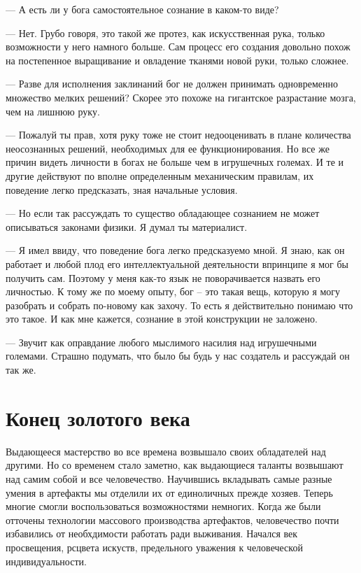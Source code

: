 \documentclass[12pt,a4paper]{article}
\newcommand{\tr}[1]{\textcolor{red}{#1}}
\newcommand{\todo}[1]{\marginpar{\scriptsize \tr{#1}}}
\begin{document}
--- А есть ли у бога самостоятельное сознание в каком-то виде?

--- Нет. Грубо говоря, это такой же протез, как искусственная рука, только возможности у него намного больше. Сам процесс его создания довольно похож на постепенное выращивание и овладение тканями новой руки, только сложнее.

--- Разве для исполнения заклинаний бог не должен принимать одновременно множество мелких решений? Скорее это похоже на гигантское разрастание мозга, чем на лишнюю руку.

--- Пожалуй ты прав, хотя руку тоже не стоит недооценивать в плане количества неосознанных решений, необходимых для ее функционирования. Но все же причин видеть личности в богах не больше чем в игрушечных големах. И те и другие действуют по вполне определенным механическим правилам, их поведение легко предсказать, зная начальные условия.

--- Но если так рассуждать то существо обладающее сознанием не может описываться законами физики. Я думал ты материалист.

--- Я имел ввиду, что поведение бога легко предсказуемо мной. Я знаю, как он работает и любой плод его интеллектуальной деятельности впринципе я мог бы получить сам. Поэтому у меня как-то язык не поворачивается назвать его личностью. К тому же по моему опыту, бог -- это такая вещь, которую я могу разобрать и собрать по-новому как захочу. То есть я действительно понимаю что это такое. И как мне кажется, сознание в этой конструкции не заложено.\todo{слишком надменно?}

--- Звучит как оправдание любого мыслимого насилия над игрушечными големами. Страшно подумать, что было бы будь у нас создатель и рассуждай он так же.


\section*{Конец золотого века}

Выдающееся мастерство во все времена возвышало своих обладателей над другими. Но со временем стало заметно, как выдающиеся таланты возвышают над самим собой и все человечество. 
Научившись вкладывать самые разные умения в артефакты мы отделили их от единоличных прежде хозяев. Теперь многие смогли воспользоваться возможностями немногих. Когда же были отточены технологии массового производства артефактов, человечество почти избавились от необхдимости работать ради выживания. Начался век просвещения, рсцвета искуств, предельного уважения к человеческой индивидуальности. 
\end{document}
